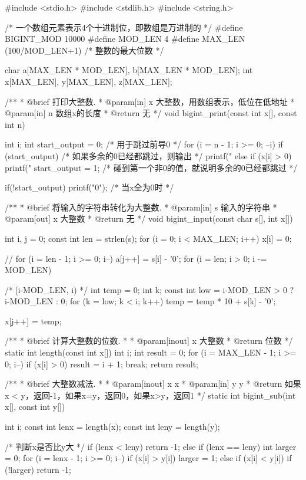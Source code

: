 \begin{Codex}[label=bigint_div.c]
#include <stdio.h>
#include <stdlib.h>
#include <string.h>

/* 一个数组元素表示4个十进制位，即数组是万进制的 */
#define BIGINT_MOD 10000
#define MOD_LEN 4
#define MAX_LEN (100/MOD_LEN+1)  /* 整数的最大位数 */

char    a[MAX_LEN * MOD_LEN], b[MAX_LEN * MOD_LEN];
int     x[MAX_LEN], y[MAX_LEN], z[MAX_LEN];

/**
 * @brief 打印大整数.
 * @param[in] x 大整数，用数组表示，低位在低地址
 * @param[in] n 数组x的长度
 * @return 无
 */
void bigint_print(const int x[], const int n) {
    int i;
    int start_output = 0;  /* 用于跳过前导0 */
    for (i = n - 1; i >= 0; --i) {
        if (start_output) {  /* 如果多余的0已经都跳过，则输出 */
            printf("%
        } else if (x[i] > 0) {
            printf("%
            start_output = 1; /* 碰到第一个非0的值，就说明多余的0已经都跳过 */
        }
    }

    if(!start_output) printf("0");  /* 当x全为0时 */
}

/**
 * @brief 将输入的字符串转化为大整数.
 * @param[in] s 输入的字符串
 * @param[out] x 大整数
 * @return 无
 */
void bigint_input(const char s[], int x[]) {
    int i, j = 0;
    const int len = strlen(s);
    for (i = 0; i < MAX_LEN; i++) x[i] = 0;

    // for (i = len - 1; i >= 0; i--) a[j++] = s[i] - '0';
    for (i = len; i > 0; i -= MOD_LEN) {  /* [i-MOD_LEN, i) */
        int temp = 0;
        int k;
        const int low = i-MOD_LEN > 0 ? i-MOD_LEN : 0;
        for (k = low; k < i; k++) {
            temp = temp * 10 + s[k] - '0';
        }

        x[j++] = temp;
    }
}

/**
 * @brief 计算大整数的位数.
 *
 * @param[inout] x 大整数
 * @return 位数
 */
static int length(const int x[]) {
    int i;
    int result = 0;
    for (i = MAX_LEN - 1; i >= 0; i--) if (x[i] > 0) {
        result = i + 1;
        break;
    }
    return result;
}

/**
 * @brief 大整数减法.
 *
 * @param[inout] x x
 * @param[in] y y
 * @return 如果x < y，返回-1，如果x=y，返回0，如果x>y，返回1
 */
static int bigint_sub(int x[], const int y[]) {
    int i;
    const int lenx = length(x);
    const int leny = length(y);

    /* 判断x是否比y大 */
    if (lenx < leny) return -1;
    else if (lenx == leny) {
        int larger = 0;
        for (i = lenx - 1; i >= 0; i--) {
            if (x[i] > y[i]) {
                larger = 1;
            } else if (x[i] < y[i]) {
                if (!larger) return -1;
            }
        }
    }
    
}
\end{Codex}
